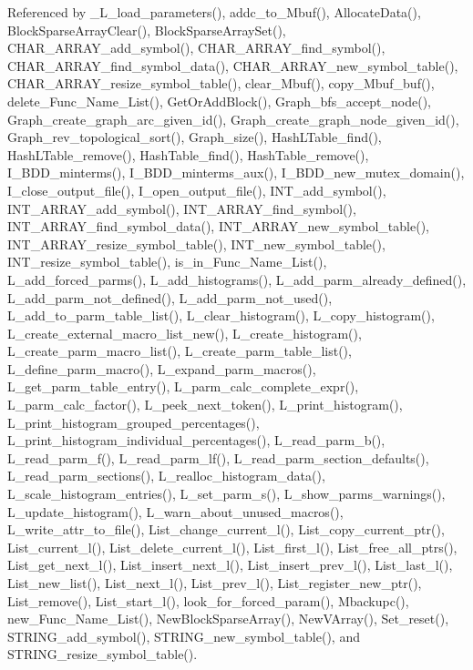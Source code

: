 Referenced by \_\-L\_\-load\_\-parameters(), addc\_\-to\_\-Mbuf(), Allocate\-Data(), Block\-Sparse\-Array\-Clear(), Block\-Sparse\-Array\-Set(), CHAR\_\-ARRAY\_\-add\_\-symbol(), CHAR\_\-ARRAY\_\-find\_\-symbol(), CHAR\_\-ARRAY\_\-find\_\-symbol\_\-data(), CHAR\_\-ARRAY\_\-new\_\-symbol\_\-table(), CHAR\_\-ARRAY\_\-resize\_\-symbol\_\-table(), clear\_\-Mbuf(), copy\_\-Mbuf\_\-buf(), delete\_\-Func\_\-Name\_\-List(), Get\-Or\-Add\-Block(), Graph\_\-bfs\_\-accept\_\-node(), Graph\_\-create\_\-graph\_\-arc\_\-given\_\-id(), Graph\_\-create\_\-graph\_\-node\_\-given\_\-id(), Graph\_\-rev\_\-topological\_\-sort(), Graph\_\-size(), Hash\-LTable\_\-find(), Hash\-LTable\_\-remove(), Hash\-Table\_\-find(), Hash\-Table\_\-remove(), I\_\-BDD\_\-minterms(), I\_\-BDD\_\-minterms\_\-aux(), I\_\-BDD\_\-new\_\-mutex\_\-domain(), I\_\-close\_\-output\_\-file(), I\_\-open\_\-output\_\-file(), INT\_\-add\_\-symbol(), INT\_\-ARRAY\_\-add\_\-symbol(), INT\_\-ARRAY\_\-find\_\-symbol(), INT\_\-ARRAY\_\-find\_\-symbol\_\-data(), INT\_\-ARRAY\_\-new\_\-symbol\_\-table(), INT\_\-ARRAY\_\-resize\_\-symbol\_\-table(), INT\_\-new\_\-symbol\_\-table(), INT\_\-resize\_\-symbol\_\-table(), is\_\-in\_\-Func\_\-Name\_\-List(), L\_\-add\_\-forced\_\-parms(), L\_\-add\_\-histograms(), L\_\-add\_\-parm\_\-already\_\-defined(), L\_\-add\_\-parm\_\-not\_\-defined(), L\_\-add\_\-parm\_\-not\_\-used(), L\_\-add\_\-to\_\-parm\_\-table\_\-list(), L\_\-clear\_\-histogram(), L\_\-copy\_\-histogram(), L\_\-create\_\-external\_\-macro\_\-list\_\-new(), L\_\-create\_\-histogram(), L\_\-create\_\-parm\_\-macro\_\-list(), L\_\-create\_\-parm\_\-table\_\-list(), L\_\-define\_\-parm\_\-macro(), L\_\-expand\_\-parm\_\-macros(), L\_\-get\_\-parm\_\-table\_\-entry(), L\_\-parm\_\-calc\_\-complete\_\-expr(), L\_\-parm\_\-calc\_\-factor(), L\_\-peek\_\-next\_\-token(), L\_\-print\_\-histogram(), L\_\-print\_\-histogram\_\-grouped\_\-percentages(), L\_\-print\_\-histogram\_\-individual\_\-percentages(), L\_\-read\_\-parm\_\-b(), L\_\-read\_\-parm\_\-f(), L\_\-read\_\-parm\_\-lf(), L\_\-read\_\-parm\_\-section\_\-defaults(), L\_\-read\_\-parm\_\-sections(), L\_\-realloc\_\-histogram\_\-data(), L\_\-scale\_\-histogram\_\-entries(), L\_\-set\_\-parm\_\-s(), L\_\-show\_\-parms\_\-warnings(), L\_\-update\_\-histogram(), L\_\-warn\_\-about\_\-unused\_\-macros(), L\_\-write\_\-attr\_\-to\_\-file(), List\_\-change\_\-current\_\-l(), List\_\-copy\_\-current\_\-ptr(), List\_\-current\_\-l(), List\_\-delete\_\-current\_\-l(), List\_\-first\_\-l(), List\_\-free\_\-all\_\-ptrs(), List\_\-get\_\-next\_\-l(), List\_\-insert\_\-next\_\-l(), List\_\-insert\_\-prev\_\-l(), List\_\-last\_\-l(), List\_\-new\_\-list(), List\_\-next\_\-l(), List\_\-prev\_\-l(), List\_\-register\_\-new\_\-ptr(), List\_\-remove(), List\_\-start\_\-l(), look\_\-for\_\-forced\_\-param(), Mbackupc(), new\_\-Func\_\-Name\_\-List(), New\-Block\-Sparse\-Array(), New\-VArray(), Set\_\-reset(), STRING\_\-add\_\-symbol(), STRING\_\-new\_\-symbol\_\-table(), and STRING\_\-resize\_\-symbol\_\-table().
